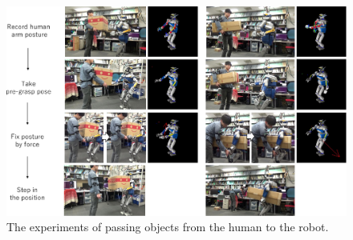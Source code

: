 \begin{figure}[htbp]
 \begin{center}
  \includegraphics[width=2.00\columnwidth]{figs/passing_ex2}
  \caption{The experiments of passing objects from the human to the robot.}
  \label{figure:passing}
 \end{center}
\end{figure}

